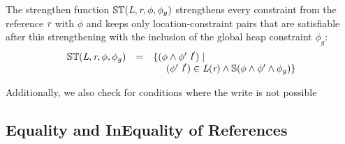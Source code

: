 \begin{definition}
\label{def:ST}
The strengthen function $\mathbb{ST}(\emph{L},\emph{r},\phi,\phi_g)$ strengthens every
constraint from the reference $\emph{r}$ with $\phi$ and keeps only location-constraint
pairs that are satisfiable after this strengthening with the inclusion of the global heap constraint $\phi_g$:
\[
\begin{array}{rcl} 
\mathbb{ST}(\emph{L},\emph{r},\phi,\phi_g) & = & \{ (\phi\wedge\phi^\prime\ \emph{l}^\prime) \mid  \\
& & \ \ \ \ (\phi^\prime\ \emph{l}^\prime)\in \emph{L}(\emph{r})\wedge\mathbb{S}(\phi\wedge\phi^\prime\wedge\phi_g) \}
\end{array}
\]
\end{definition}

Additionally, we also check for conditions where the write is not possible 

\begin{comment}
\begin{figure}[t]
\begin{center}
\begin{tabular}[c]{l}
$\Psi_x = \{ (true, l_0, r_1^i) \}$\\
$ST (L, r_3^s, \phi, \phi_g)$ \\
$\theta = \{ (\phi_{2a}\; l_\mathit{null} ) (\phi_{2b}\; l_2) (\phi_{2c}\; l_1) \}$\\
$ST(L, r_0, \phi, \phi_g)$\\
$\theta = \{ \}$\\
\end{tabular}
\end{center}
\caption{field write for this.x = this.y sets}
\label{fig:faHeapSets}
\end{figure}
\end{comment}

\subsection{Equality and InEquality of References}



